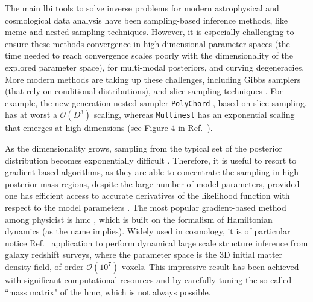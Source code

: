 The main \gls*{lbi} tools to solve inverse problems for modern astrophysical and cosmological data analysis have been sampling-based inference methods, like \gls*{mcmc} \citep{Metropolis:1953am, Hastings:1970aa} and nested sampling \citep{Skilling:2006gxv, Feroz:2008xx, Ashton:2022grj} techniques. However, it is especially challenging to ensure these methods convergence in high dimensional parameter spaces (the time needed to reach convergence scales poorly with the dimensionality of the explored parameter space), for multi-modal posteriors, and curving degeneracies. More modern methods are taking up these challenges, including Gibbs samplers \cite{Smith:1993gibbs} (that rely on conditional distributions), and slice-sampling techniques \cite{Neal:aa, Handley:2015fda}. For example, the new generation nested sampler \texttt{PolyChord} \cite{Handley:2015fda}, based on slice-sampling, has at worst a $\mathcal{O}(D^3)$ scaling, whereas \texttt{Multinest} \cite{Feroz:2008xx} has an exponential scaling that emerges at high dimensions (see Figure 4 in Ref.~\cite{Handley:2015fda}).

As the dimensionality grows, sampling from the typical set of the posterior distribution becomes exponentially difficult \cite{betancourt2017conceptual}. Therefore, it is useful to resort to gradient-based algorithms, as they are able to concentrate the sampling in high posterior mass regions, despite the large number of model parameters, provided one has efficient access to accurate derivatives of the likelihood function with respect to the model parameters \cite{betancourt2017conceptual}. The most popular gradient-based method among physicist is \gls*{hmc} \cite{Duane:1987hmc, neal2012mcmc}, which is built on the formalism of Hamiltonian dynamics (as the name implies). Widely used in cosmology, it is of particular notice Ref.~\cite{Jasche:2012kq} application to perform dynamical large scale structure inference from galaxy redshift surveys, where the parameter space is the 3D initial matter density field, of order $\mathcal{O}(10^7)$ voxels. This impressive result has been achieved with significant computational resources and by carefully tuning the so called ``mass matrix" of the \gls*{hmc}, which is not always possible. 

